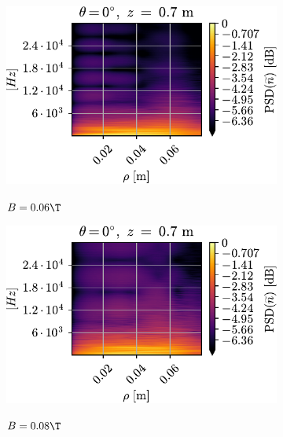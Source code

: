 \begin{figure}[htbp]
    \centering
    \begin{subfigure}[h]{0.45\textwidth}
        \centering
        \includegraphics[width=1.0\textwidth]{fig/results/poloidalFlow/PSD2D006}
        \label{fig:PSD2D006}
        \caption{$B=0.06\T$}
    \end{subfigure}%
    \hfill
    \begin{subfigure}[h]{0.45\textwidth}
        \centering
        \includegraphics[width=1.0\textwidth]{fig/results/poloidalFlow/PSD2D008}
        \label{fig:PSD2D008}
        \caption{$B=0.08\T$}
    \end{subfigure}
    \\
    \begin{subfigure}[h]{0.45\textwidth}
        \centering

\end{subfigure}
\end{figure}
